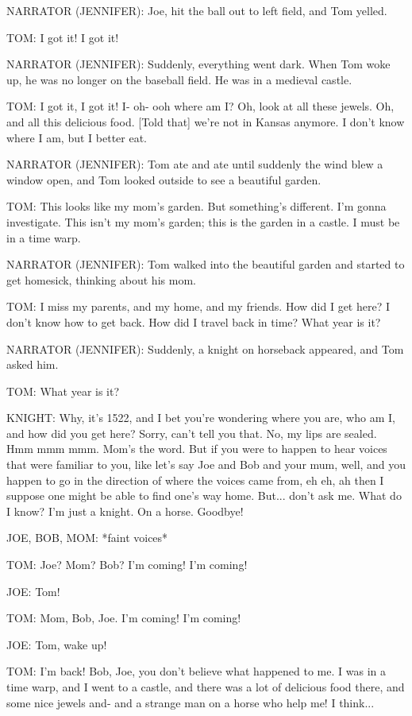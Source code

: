 NARRATOR (JENNIFER):
Joe, hit the ball out to left field, and Tom yelled.

TOM:
I got it!
I got it!

NARRATOR (JENNIFER):
Suddenly, everything went dark.
When Tom woke up, he was no longer on the baseball field.
He was in a medieval castle.

TOM:
I got it, I got it!
I- oh- ooh where am I?
Oh, look at all these jewels.
Oh, and all this delicious food.
    [Told that] we're not in Kansas anymore.
I don't know where I am, but I better eat.

NARRATOR (JENNIFER):
Tom ate and ate until suddenly the wind blew a window open, and Tom looked outside to see a beautiful garden.

TOM:
This looks like my mom's garden.
But something's different.
I'm gonna investigate.
This isn't my mom's garden; this is the garden in a castle.
I must be in a time warp.

NARRATOR (JENNIFER):
Tom walked into the beautiful garden and started to get homesick, thinking about his mom.

TOM:
I miss my parents, and my home, and my friends.
How did I get here?
I don't know how to get back.
How did I travel back in time?
What year is it?

NARRATOR (JENNIFER):
Suddenly, a knight on horseback appeared, and Tom asked him.

TOM:
What year is it?

KNIGHT:
Why, it's 1522, and I bet you're wondering where you are, who am I, and how did you get here?
Sorry, can't tell you that.
No, my lips are sealed.
Hmm mmm mmm.
Mom's the word.
But if you were to happen to hear voices that were familiar to you, like let's say Joe and Bob and your mum, well, and you happen to go in the direction of where the voices came from, eh eh, ah then I suppose one might be able to find one's way home.
But... don't ask me.
What do I know?
I'm just a knight.
On a horse.
Goodbye!

JOE, BOB, MOM:
*faint voices*

TOM:
Joe?
Mom?
Bob?
I'm coming!
I'm coming!

JOE:
Tom!

TOM:
Mom, Bob, Joe.
I'm coming!
I'm coming!

JOE:
Tom, wake up!

TOM:
I'm back!
Bob, Joe, you don't believe what happened to me.
I was in a time warp, and I went to a castle, and there was a lot of delicious food there, and some nice jewels and- and a strange man on a horse who help me!
I think...


